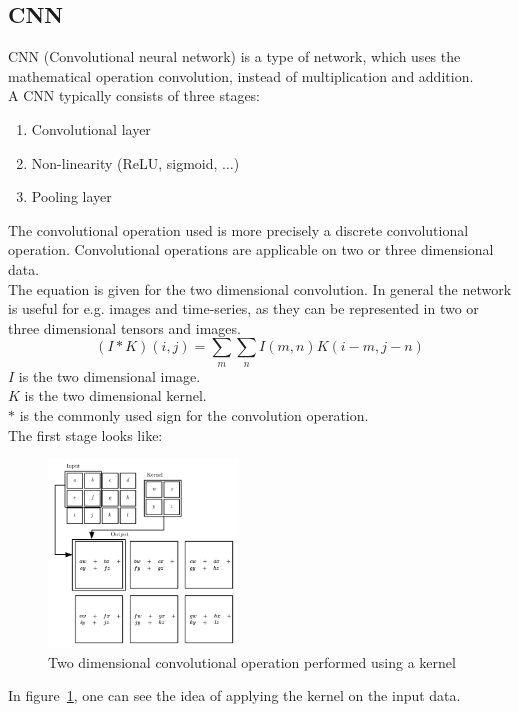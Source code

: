  \subsection{CNN} \label{subsection::cnn}
  CNN (Convolutional neural network) is a type of network, which uses the mathematical operation convolution, instead of multiplication and addition.\\
  A CNN typically consists of three stages:
  \begin{enumerate}
   \item Convolutional layer
   \item Non-linearity (ReLU, sigmoid, $\ldots$)
   \item Pooling layer
  \end{enumerate}
  The convolutional operation used is more precisely a discrete convolutional operation.
  Convolutional operations are applicable on two or three dimensional data.\\
  The equation is given for the
  two dimensional convolution. In general the network is useful for e.g. images and time-series, as they can be represented in two or three dimensional tensors 
  and images.
  \begin{equation}
   (I \ast K)(i, j) = \sum_m\sum_nI(m,n)K(i-m,j-n)
  \end{equation}
  $I$ is the two dimensional image.\\
  $K$ is the two dimensional kernel.\\
  $\ast$ is the commonly used sign for the convolution operation.\\
  The first stage looks like:
  \begin{figure}[H]
   \includegraphics[width=0.45\textwidth]{../Images/kernel.png}
   \centering
   \caption{Two dimensional convolutional operation performed using a kernel \cite{Goodfellow2016}}
   \label{fig:kernel}
  \end{figure}\noindent
  In figure~\ref{fig:kernel}, one can see the idea of applying the kernel on the input data.\\
